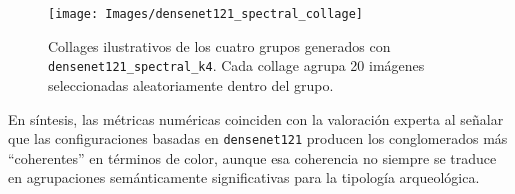 \begin{figure}[htpb]
  \centering
  \texttt{[image: Images/densenet121\_spectral\_collage]}
  \caption{Collages ilustrativos de los cuatro grupos generados con \texttt{densenet121\_spectral\_k4}.
  Cada collage agrupa 20 imágenes seleccionadas aleatoriamente dentro del grupo.}
  \label{fig:cluster_collages}
\end{figure}

En síntesis, las métricas numéricas coinciden con la valoración experta al señalar que las configuraciones basadas en \texttt{densenet121} producen los conglomerados más “coherentes” en términos de color, aunque esa coherencia no siempre se traduce en agrupaciones semánticamente significativas para la tipología arqueológica.
